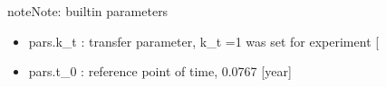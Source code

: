 \documentclass[letterpaper,10pt,english]{sphinxmanual}
\begin{document}
\begin{fulllineitems}
\begin{quote}
\begin{description}
\end{description}\end{quote}

\begin{sphinxadmonition}{note}{Note:}
\sphinxAtStartPar
built\sphinxhyphen{}in parameters
\begin{itemize}
\item {} 
\sphinxAtStartPar
pars.k\_t : transfer parameter, k\_t =1 was set for experiment {[}\sphinxhyphen{}{]}

\item {} 
\sphinxAtStartPar
pars.t\_0 : reference point of time, 0.0767 {[}year{]}

\end{itemize}
\end{sphinxadmonition}

\end{fulllineitems}

\end{document}
